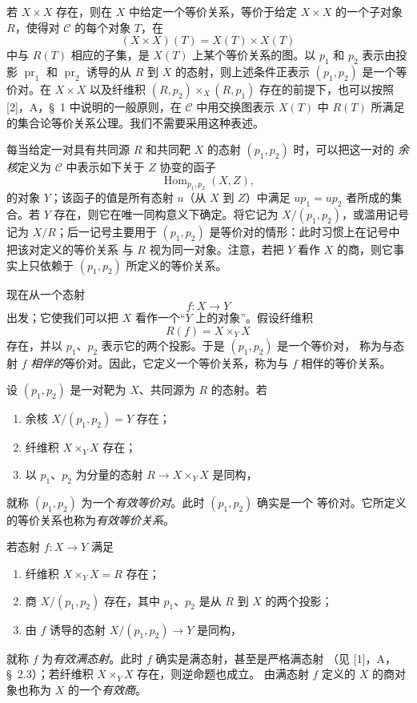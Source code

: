 若 $X\times X$ 存在，则在 $X$ 中给定一个等价关系，等价于给定
$X\times X$ 的一个子对象 $R$，使得对 $\mathcal C$ 的每个对象 $T$，在
\[
  (X\times X)(T)=X(T)\times X(T)
\]
中与 $R(T)$ 相应的子集，是 $X(T)$ 上某个等价关系的图。以 $p_1$ 和 $p_2$
表示由投影 $\operatorname{pr}_1$ 和 $\operatorname{pr}_2$ 诱导的从 $R$
到 $X$ 的态射，则上述条件正表示 $(p_1,p_2)$ 是一个等价对。在
$X\times X$ 以及纤维积 $(R,p_2)\times_X(R,p_1)$ 存在的前提下，也可以按照
[2]，A，\S~1 中说明的一般原则，在 $\mathcal C$ 中用交换图表示 $X(T)$ 中
$R(T)$ 所满足的集合论等价关系公理。我们不需要采用这种表述。

每当给定一对具有共同源 $R$ 和共同靶 $X$ 的态射 $(p_1,p_2)$ 时，可以把这一对的
\emph{余核}定义为 $\mathcal C$ 中表示如下关于 $Z$ 协变的函子
\[
  \operatorname{Hom}_{p_1,p_2}(X,Z),
\]
的对象 $Y$；该函子的值是所有态射 $u$（从 $X$ 到 $Z$）中满足
$up_1=up_2$ 者所成的集合。若 $Y$ 存在，则它在唯一同构意义下确定。将它记为
$X/(p_1,p_2)$，或滥用记号记为 $X/R$；后一记号主要用于
$(p_1,p_2)$ 是等价对的情形：此时习惯上在记号中把该对定义的等价关系
与 $R$ 视为同一对象。注意，若把 $Y$ 看作 $X$ 的商，则它事实上只依赖于
$(p_1,p_2)$ 所定义的等价关系。

现在从一个态射
\[
  f:X\longrightarrow Y
\]
出发；它使我们可以把 $X$ 看作一个“$Y$ 上的对象”。假设纤维积
\[
  R(f)=X\times_Y X
\]
存在，并以 $p_1$、$p_2$ 表示它的两个投影。于是 $(p_1,p_2)$ 是一个等价对，
称为与态射 $f$ \emph{相伴的}等价对。因此，它定义一个等价关系，称为与 $f$
相伴的等价关系。

设 $(p_1,p_2)$ 是一对靶为 $X$、共同源为 $R$ 的态射。若
\begin{enumerate}
  \item[(i)] 余核 $X/(p_1,p_2)=Y$ 存在；
  \item[(ii)] 纤维积 $X\times_Y X$ 存在；
  \item[(iii)] 以 $p_1$、$p_2$ 为分量的态射
  $R\longrightarrow X\times_Y X$ 是同构，
\end{enumerate}
就称 $(p_1,p_2)$ 为一个\emph{有效等价对}。此时 $(p_1,p_2)$ 确实是一个
等价对。它所定义的等价关系也称为\emph{有效等价关系}。

若态射 $f:X\longrightarrow Y$ 满足
\begin{enumerate}
  \item[(i)] 纤维积 $X\times_Y X=R$ 存在；
  \item[(ii)] 商 $X/(p_1,p_2)$ 存在，其中 $p_1$、$p_2$ 是从 $R$ 到 $X$
  的两个投影；
  \item[(iii)] 由 $f$ 诱导的态射
  $X/(p_1,p_2)\longrightarrow Y$ 是同构，
\end{enumerate}
就称 $f$ 为\emph{有效满态射}。此时 $f$ 确实是满态射，甚至是严格满态射
（见 [1]，A，\S~2.3）；若纤维积 $X\times_Y X$ 存在，则逆命题也成立。
由满态射 $f$ 定义的 $X$ 的商对象也称为 $X$ 的一个\emph{有效商}。


